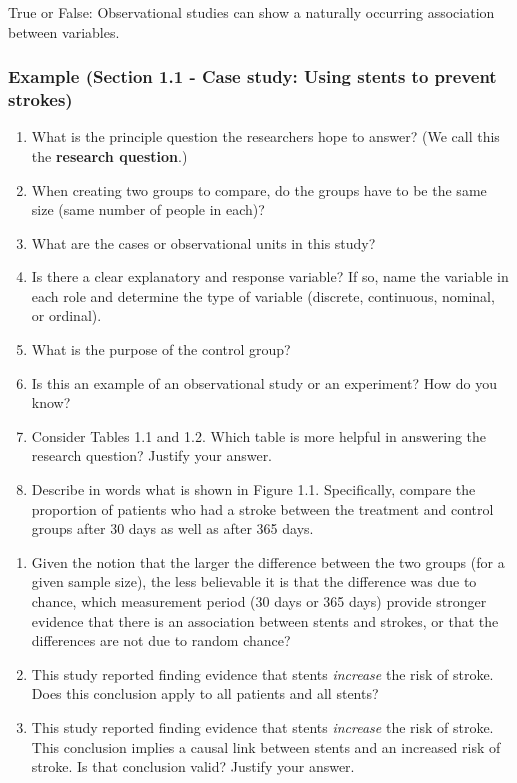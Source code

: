 \documentclass[
]{report}
\newcommand{\rgs}{\vspace{12pt}} %
\begin{document}
True or False: Observational studies can show a naturally occurring association between variables.

\hypertarget{example-section-1.1---case-study-using-stents-to-prevent-strokes}{%
\subsubsection*{Example (Section 1.1 - Case study: Using stents to prevent strokes)}\label{example-section-1.1---case-study-using-stents-to-prevent-strokes}}

\begin{enumerate}
\def\labelenumi{\arabic{enumi}.}
\item
  What is the principle question the researchers hope to answer? (We call this the \textbf{research question}.)
  \rgs
  \rgs
\item
  When creating two groups to compare, do the groups have to be the same size (same number of people in each)?
  \rgs
  \rgs
\item
  What are the cases or observational units in this study?
  \rgs
  \rgs
\item
  Is there a clear explanatory and response variable? If so, name the variable in each role and determine the type of variable (discrete, continuous, nominal, or ordinal).
  \rgs
  \rgs
\item
  What is the purpose of the control group?
  \rgs
  \rgs
\item
  Is this an example of an observational study or an experiment? How do you know?
  \rgs
  \rgs
\item
  Consider Tables 1.1 and 1.2. Which table is more helpful in answering the research question? Justify your answer.
  \rgs
  \rgs
\item
  Describe in words what is shown in Figure 1.1. Specifically, compare the proportion of patients who had a stroke between the treatment and control groups after 30 days as well as after 365 days.
  \rgs
  \rgs
\end{enumerate}

\newpage

\begin{enumerate}
\def\labelenumi{\arabic{enumi}.}
\setcounter{enumi}{8}
\item
  Given the notion that the larger the difference between the two groups (for a given sample size), the less believable it is that the difference was due to chance, which measurement period (30 days or 365 days) provide stronger evidence that there is an association between stents and strokes, or that the differences are not due to random chance?
  \rgs
  \rgs
\item
  This study reported finding evidence that stents \emph{increase} the risk of stroke. Does this conclusion apply to all patients and all stents?
  \rgs
  \rgs
\item
  This study reported finding evidence that stents \emph{increase} the risk of stroke. This conclusion implies a causal link between stents and an increased risk of stroke. Is that conclusion valid? Justify your answer.
\end{enumerate}
\end{document}
